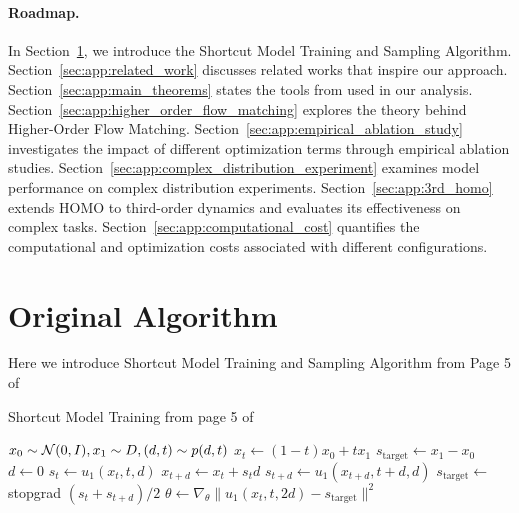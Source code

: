 

\paragraph{Roadmap.}  
In Section~\ref{sec:app:original_algorithm}, we introduce the Shortcut Model Training and Sampling Algorithm. Section~\ref{sec:app:related_work} discusses related works that inspire our approach. 
Section~\ref{sec:app:main_theorems} states the tools from \cite{fsi+24} used in our analysis. Section~\ref{sec:app:higher_order_flow_matching} explores the theory behind Higher-Order Flow Matching. Section~\ref{sec:app:empirical_ablation_study} investigates the impact of different optimization terms through empirical ablation studies. Section~\ref{sec:app:complex_distribution_experiment} examines model performance on complex distribution experiments. 
Section~\ref{sec:app:3rd_homo} extends HOMO to third-order dynamics and evaluates its effectiveness on complex tasks. Section~\ref{sec:app:computational_cost} quantifies the computational and optimization costs associated with different configurations.

\section{Original Algorithm}\label{sec:app:original_algorithm}
Here we introduce Shortcut Model Training and Sampling Algorithm from Page 5 of~\cite{fhla24}
\begin{algorithm}[!ht]\caption{Shortcut Model Training from page 5 of~\cite{fhla24}}
\begin{algorithmic}[1]
\State $x_0 \sim \mathcal{N} (0, I), x_1 \sim D, (d, t) \sim p(d, t)$
\State $x_t \gets (1 - t) x_0 + t x_1$ 
\State $s_{\mathrm{target}} \gets x_1 - x_0$ 
\State $d \gets 0$
\EndFor
{}
\State $s_t \gets u_1 ( x_t, t, d )$ 
\State $x_{t + d} \gets x_t + s_t d$ 
\State $s_{t + d} \gets u_1 ( x_{t + d}, t + d, d )$ 
\State $s_{\mathrm{target}} \gets$ stopgrad $( s_t + s_{t + d} ) / 2$ 
\EndFor
\State $\theta \gets \nabla_\theta { \| u_1 ( x_t, t, 2d ) - s_{\mathrm{target}} \|^2 }$
\EndWhile
\end{algorithmic}
\end{algorithm}








